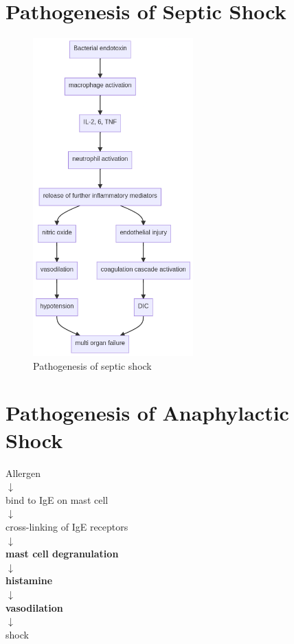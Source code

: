 \documentclass[
  12pt,
]{memoir}
\begin{document}
\pagebreak

\hypertarget{pathogenesis-of-septic-shock}{%
\section{Pathogenesis of Septic
Shock}\label{pathogenesis-of-septic-shock}}

\begin{figure}
\centering
\includegraphics[width=0.55\textwidth]{../assets/surg/septicshock.png}
\vspace{5mm}
\caption{Pathogenesis of septic shock}
\end{figure}
\pagebreak

\hypertarget{pathogenesis-of-anaphylactic-shock}{%
\section{Pathogenesis of Anaphylactic
Shock}\label{pathogenesis-of-anaphylactic-shock}}

\begin{center}
Allergen \\
 $\downarrow$  \\
 bind to IgE on mast cell  \\
 $\downarrow$  \\
 cross-linking of IgE receptors  \\
 $\downarrow$  \\
 \textbf{mast cell degranulation}  \\
 $\downarrow$  \\
 \textbf{histamine}  \\
 $\downarrow$  \\
 \textbf{vasodilation}\\  
 $\downarrow$  \\
 shock\\
\end{center}
\end{document}
